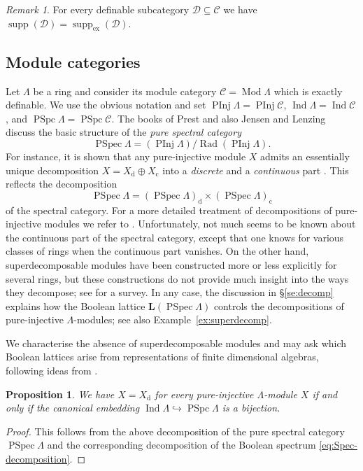\documentclass[a4paper]{amsart}
\theoremstyle{plain}
\newtheorem{prop}[thm]{Proposition}
\theoremstyle{definition}
\theoremstyle{remark}
\newtheorem{rem}[thm]{Remark}
\numberwithin{equation}{section}
\newcommand{\Ind}{\operatorname{Ind}}
\newcommand{\Mod}{\operatorname{Mod}}
\newcommand{\PInj}{\operatorname{PInj}}
\newcommand{\PSpc}{\operatorname{PSpc}}
\newcommand{\PSpec}{\operatorname{PSpec}}
\newcommand{\Rad}{\operatorname{Rad}}
\newcommand{\supp}{\operatorname{supp}}
\newcommand{\suppex}{\operatorname{supp}_{\mathrm{ex}}}
\def\C{\mathcal C}
\def\D{\mathcal D}
\def\bfL{\mathbf L}
\def\La{\Lambda}
\begin{document}
\begin{rem}
  For every definable
  subcategory $\D\subseteq\C$ we have $\supp(\D)=\suppex(\D)$.
\end{rem}

  

\subsection*{Module categories}

Let $\La$ be a ring and consider its module category $\C=\Mod\La$
which is exactly definable. We use the obvious notation and set
$\PInj\La=\PInj\C$, $\Ind\La=\Ind\C$, and $\PSpc\La=\PSpc\C$. The
books of Prest \cite{Pr1988} and also Jensen and Lenzing \cite{JL1989}
discuss the basic structure of the \emph{pure spectral
  category} \[\PSpec\La=(\PInj\La)/\Rad(\PInj\La).\] For instance, it
is shown that any pure-injective module $X$ admits an essentially
unique decomposition $X=X_{\mathrm d}\oplus X_{\mathrm c}$ into a
\emph{discrete} and a \emph{continuous} part
\cite[Corollary~8.28]{JL1989}. 
This reflects the decomposition
\begin{equation*}\label{eq:pure-spec}
  \PSpec\La=(\PSpec\La)_{\mathrm
    d}\times (\PSpec\La)_{\mathrm c}
\end{equation*}
of the spectral category.  For a more detailed treatment of
decompositions of pure-injective modules we refer to
\cite{Fa1985}. Unfortunately, not much seems to be known about the
continuous part of the spectral category, except that one knows for
various classes of rings when the continuous part vanishes. On the
other hand, superdecomposable modules have been constructed more or
less explicitly for several rings, but these constructions do not
provide much insight into the ways they decompose; see \cite{Ri2000}
for a survey. In any case, the discussion in \S\ref{se:decomp}
explains how the Boolean lattice $\bfL(\PSpec\La)$ controls the
decompositions of pure-injective $\La$-modules; see also
Example~\ref{ex:superdecomp}.

We characterise the absence of superdecomposable modules and may ask
which Boolean lattices arise from representations of finite
dimensional algebras, following ideas from \cite{Br1974}.

\begin{prop}
We have  $X=X_{\mathrm d}$ for every pure-injective
$\La$-module $X$ if and only if the canonical embedding
$\Ind\La\hookrightarrow\PSpc\La$ is a bijection.
\end{prop}
\begin{proof}
This follows from the above decomposition of the pure spectral
category $\PSpec\La$
and the corresponding decomposition of the Boolean spectrum
\eqref{eq:Spec-decomposition}.
\end{proof}
\end{document}
